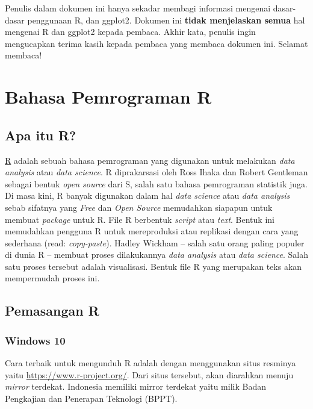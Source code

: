 \documentclass[]{book}
\begin{document}
Penulis dalam dokumen ini hanya sekadar membagi informasi mengenai
dasar-dasar penggunaan R, dan ggplot2. Dokumen ini \textbf{tidak
menjelaskan semua} hal mengenai R dan ggplot2 kepada pembaca. Akhir
kata, penulis ingin mengucapkan terima kasih kepada pembaca yang membaca
dokumen ini. Selamat membaca!

\chapter{Bahasa Pemrograman R}\label{R}

\section{Apa itu R?}\label{apa-itu-r}

\href{https://www.r-project.org/}{R} adalah sebuah bahasa pemrograman
yang digunakan untuk melakukan \emph{data analysis} atau \emph{data
science}. R diprakarsasi oleh Ross Ihaka dan Robert Gentleman sebagai
bentuk \emph{open source} dari S, salah satu bahasa pemrograman
statistik juga. Di masa kini, R banyak digunakan dalam hal \emph{data
science} atau \emph{data analysis} sebab sifatnya yang \emph{Free} dan
\emph{Open Source} memudahkan siapapun untuk membuat \emph{package}
untuk R. File R berbentuk \emph{script} atau \emph{text}. Bentuk ini
memudahkan pengguna R untuk mereproduksi atau replikasi dengan cara yang
sederhana (read: \emph{copy-paste}). Hadley Wickham -- salah satu orang
paling populer di dunia R -- membuat proses dilakukannya \emph{data
analysis} atau \emph{data science}. Salah satu proses tersebut adalah
visualisasi. Bentuk file R yang merupakan teks akan mempermudah proses
ini.

\section{Pemasangan R}\label{pemasangan-r}

\subsection*{Windows 10}\label{windows-10}

Cara terbaik untuk mengunduh R adalah dengan menggunakan situs resminya
yaitu \url{https://www.r-project.org/}. Dari situs tersebut, akan
diarahkan menuju \emph{mirror} terdekat. Indonesia memiliki mirror
terdekat yaitu milik Badan Pengkajian dan Penerapan Teknologi (BPPT).
\end{document}
